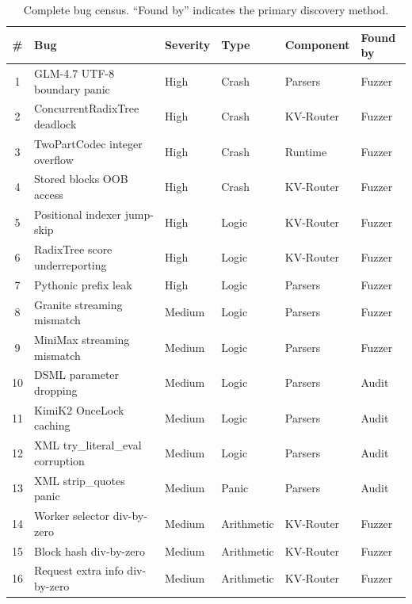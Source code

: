 \begin{table}[ht]
\centering
\small
\begin{tabular}{clllll}
\toprule
\textbf{\#} & \textbf{Bug} & \textbf{Severity} & \textbf{Type} & \textbf{Component} & \textbf{Found by} \\
\midrule
1  & GLM-4.7 UTF-8 boundary panic       & High   & Crash      & Parsers    & Fuzzer \\
2  & ConcurrentRadixTree deadlock        & High   & Crash      & KV-Router  & Fuzzer \\
3  & TwoPartCodec integer overflow       & High   & Crash      & Runtime    & Fuzzer \\
4  & Stored blocks OOB access            & High   & Crash      & KV-Router  & Fuzzer \\
5  & Positional indexer jump-skip        & High   & Logic      & KV-Router  & Fuzzer \\
6  & RadixTree score underreporting      & High   & Logic      & KV-Router  & Fuzzer \\
7  & Pythonic prefix leak                & High   & Logic      & Parsers    & Fuzzer \\
8  & Granite streaming mismatch          & Medium & Logic      & Parsers    & Fuzzer \\
9  & MiniMax streaming mismatch          & Medium & Logic      & Parsers    & Fuzzer \\
10 & DSML parameter dropping             & Medium & Logic      & Parsers    & Audit \\
11 & KimiK2 OnceLock caching             & Medium & Logic      & Parsers    & Audit \\
12 & XML try\_literal\_eval corruption   & Medium & Logic      & Parsers    & Audit \\
13 & XML strip\_quotes panic             & Medium & Panic      & Parsers    & Audit \\
14 & Worker selector div-by-zero         & Medium & Arithmetic & KV-Router  & Fuzzer \\
15 & Block hash div-by-zero              & Medium & Arithmetic & KV-Router  & Fuzzer \\
16 & Request extra info div-by-zero      & Medium & Arithmetic & KV-Router  & Fuzzer \\
\bottomrule
\end{tabular}
\caption{Complete bug census. ``Found by'' indicates the primary discovery method.}
\label{tab:bug-census}
\end{table}

